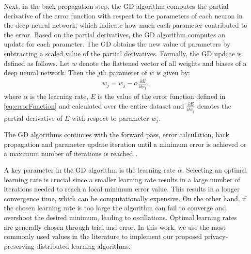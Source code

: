 \documentclass[letterpaper]{article}
\begin{document}
\begin{flushleft}
{%
Next, in the back propagation step, the GD algorithm 
computes the partial derivative of the error function with respect to the
parameters of each neuron in the deep neural network, which indicate how much each parameter contributed to
the error. Based on the partial derivatives, the GD algorithm computes an update for each parameter. 
The GD  obtains the new value of parameters by subtracting a scaled value of the partial derivatives. Formally, the GD update is
defined as follows.  Let $w$ denote the flattened vector of all weights and biases of a deep neural
network. Then the $j$th parameter of $w$ is given by:
\begin{align}\label{eq:GD}
w_j = w_j -\alpha \frac{\partial E}{\partial w_j}, 
\end{align}
where $\alpha$ is the learning rate,  $E$ is the value of the error function defined in \eqref{eq:errorFunction} and calculated over the entire dataset and $\frac{\partial E}{\partial w_j}$ denotes the partial derivative of $E$ with respect to
parameter $w_j$.

The GD algorithms continues with the forward pass, error calculation, back propagation and parameter update iteration until a minimum
error is achieved or a maximum number of iterations is reached \cite{ruder2016overview}. 

A key parameter in the GD algorithm is the learning rate $\alpha$.   Selecting an optimal learning
rate is crucial since a smaller learning rate results in a large number of iterations needed to reach a local minimum error value. This
results in a longer convergence time, which can be computationally expensive. On the other hand, if the chosen learning rate is too
large the algorithm can fail to converge and overshoot the desired minimum, leading to oscillations.  Optimal learning rates are
generally chosen through trial and error. In this work, we use the most commonly used values in the literature to implement our
proposed privacy-preserving distributed learning algorithms. 

}
\end{flushleft}
\end{document}
